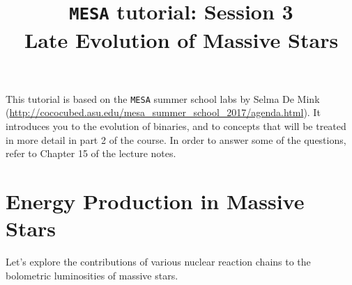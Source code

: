 \documentclass[11pt,a4paper]{article}
\begin{document}
\title{
    \textbf{\texttt{MESA} tutorial: Session 3} \\
    \textbf{\Large Late Evolution of Massive Stars}
}
\date{}
\maketitle
\vspace{-1cm}


\noindent
This tutorial is based on the \texttt{MESA} summer school labs by Selma De Mink (\url{http://cococubed.asu.edu/mesa_summer_school_2017/agenda.html}). It introduces you to the evolution of binaries, and to concepts that will be treated in more detail in part 2 of the course. In order to answer some of the questions, refer to Chapter 15 of the lecture notes.



\section{Energy Production in Massive Stars}

Let's explore the contributions of various nuclear reaction chains to the bolometric luminosities of massive stars.
\end{document}
